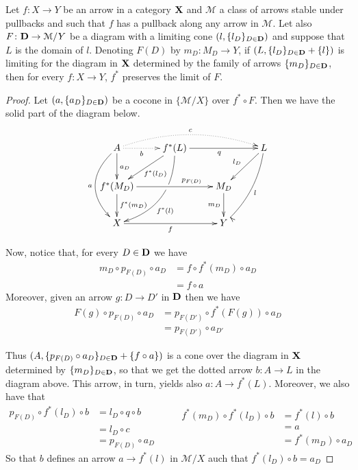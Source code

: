 \documentclass[a4paper,UKenglish,cleveref,pdftex,thm-restate,numberwithinsect]{lipics-v2021}
\def\D{\textbf {\textup{D}}}
\def\X{\textbf {\textup{X}}}
\begin{document}
\begin{proposition} Let $f\colon X\to Y$ be an arrow in a category $\X$ and $\mathcal{M}$ a class of arrows stable under pullbacks and such that $f$ has a pullback along any arrow in $\mathcal{M}$. Let also $F\colon\D\to \mathcal{M}/Y$ be a diagram with a limiting cone $(l, \{l_D\}_{D\in \D})$ and suppose that  $L$ is the domain of $l$. Denoting $F(D)$ by  $m_D\colon M_D\to Y$, if  $(L, \{l_D\}_{D\in \D}+\{l\})$ is limiting for the diagram in $\X$ determined by the family of arrows $\{m_D\}_{D\in \D}$, then for every $f\colon X\to Y$, $f^*$ preserves the limit of $F$.
\end{proposition}
\begin{proof}
	Let $(a, \{a_D\}_{D\in \D})$ be a cocone in $\{\mathcal{M}/X\}$ over $f^*\circ F$. Then we have the solid part of the diagram below.
	\[\xymatrix{A \ar@/_.8cm/[dd]_{a}\ar[d]^{a_D}  \ar@{.>}[r]_-{b} \ar@/^.5cm/@{.>}[rrr]^{c}&f^*(L)  \ar@/^.7cm/[ddl]|(.37)\hole^(.6){f^*(l)} \ar[rr]_{q} \ar[dl]^{f^*(l_D)}&&L \ar@/^.3cm/[ddl]^{l} \ar[dl]_{l_D}\\f^*(M_D)  \ar[d]^{f^*(m_D)} \ar[rr]^(.7){p_{F(D)}}&& M_D \ar[d]_{m_D} \\ X \ar[rr]_{f}&& Y }\]
	
	Now, notice that, for every $D\in \D$ we have
	\begin{align*}
		m_D\circ p_{F(D)} \circ a_D&=f\circ f^*(m_D)\circ a_D \\&=f\circ a
	\end{align*}
	Moreover, given an arrow $g\colon D\to D'$ in $\D$ then we have
	\begin{align*}
		F(g)\circ p_{F(D)}\circ a_D&=p_{F(D')}\circ f^*(F(g))\circ a_D\\&=p_{F(D')}\circ a_{D'}
	\end{align*}
	
	Thus $(A, \{p_{F(D)}\circ a_D\}_{D\in \D}+ \{f\circ a\})$ is a cone over the diagram in $\X$ determined by $\{m_D\}_{D\in \D}$, so that we get the dotted arrow $b\colon A\to L$ in the diagram above. This arrow,  in turn, yields also $a\colon A\to f^*(L)$. Moreover, we also have that
	\[
	\begin{split}
		p_{F(D)}\circ f^*(l_D)\circ b&= l_D\circ q \circ b\\&=l_D\circ c\\&=p_{F(D)}\circ a_D
	\end{split}\qquad 
	\begin{split}
		f^*(m_D) \circ f^*(l_D)\circ b&= f^*(l)\circ b\\&=a\\&=f^*(m_D)\circ a_D
	\end{split}
	\]
	So that $b$ defines an arrow $a\to f^*(l)$ in $\mathcal{M}/X$ auch that $f^*(l_D)\circ b =a_D$
	

\end{proof}
\end{document}
